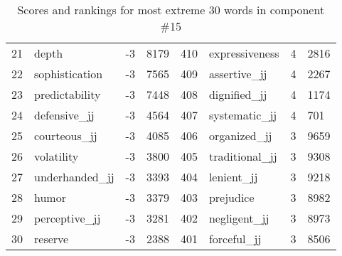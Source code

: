 \begin{table}[tbp]
\begin{tabular}{| rlr@{.}l | rlr@{.}l |}
    21 & depth & -3 & 8179    &    410 & expressiveness & 4 & 2816 \\
    22 & sophistication & -3 & 7565    &    409 & assertive\_jj & 4 & 2267 \\
    23 & predictability & -3 & 7448    &    408 & dignified\_jj & 4 & 1174 \\
    24 & defensive\_jj & -3 & 4564    &    407 & systematic\_jj & 4 & 701 \\
    25 & courteous\_jj & -3 & 4085    &    406 & organized\_jj & 3 & 9659 \\
    26 & volatility & -3 & 3800    &    405 & traditional\_jj & 3 & 9308 \\
    27 & underhanded\_jj & -3 & 3393    &    404 & lenient\_jj & 3 & 9218 \\
    28 & humor & -3 & 3379    &    403 & prejudice & 3 & 8982 \\
    29 & perceptive\_jj & -3 & 3281    &    402 & negligent\_jj & 3 & 8973 \\
    30 & reserve & -3 & 2388    &    401 & forceful\_jj & 3 & 8506 \\
    \hline
    \end{tabular}
    \caption{Scores and rankings for most extreme 30 words in component \#15} 
\end{table}
\clearpage
